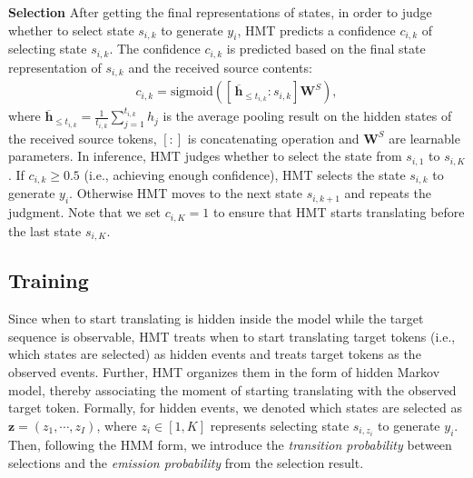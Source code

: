 \documentclass{article} %
\begin{document}
\textbf{Selection} After getting the final representations of states, in order to judge whether to select state $s_{i,k}$ to generate $y_{i}$, HMT predicts a confidence $c_{i,k}$ of selecting state $s_{i,k}$. The confidence $c_{i,k}$ is predicted based on the final state representation of $s_{i,k}$ and the received source contents:
\begin{gather}
    c_{i,k}=\mathrm{sigmoid}\left ( \left [ \,\overline{\mathbf{h}}_{\leq t_{i,k}}\!: s_{i,k} \right ]\!\mathbf{W}^{S} \right ), \label{eq:bik}
\end{gather}
\vspace{-1mm}where $\overline{\mathbf{h}}_{\leq t_{i,k}}\!=\!\frac{1}{t_{i,k}}\sum_{j=1}^{t_{i,k}} h_{j}$ is the average pooling result on the hidden states of the received source tokens, $\left [ :\right ]$ is concatenating operation and $\mathbf{W}^{S}$ are learnable parameters.
In inference, HMT judges whether to select the state from $s_{i,1}$ to $s_{i,K}$. If $c_{i,k}\!\geq\! 0.5$ (i.e., achieving enough confidence), HMT selects the state $s_{i,k}$ to generate $y_{i}$. Otherwise HMT moves to the next state $s_{i,k+1}$ and repeats the judgment. Note that we set $c_{i,K}\!=\!1$ to ensure that HMT starts translating before the last state $s_{i,K}$.


\subsection{Training}
\label{sec:training}

Since when to start translating is hidden inside the model while the target sequence is observable, HMT treats when to start translating target tokens (i.e., which states are selected) as hidden events and treats target tokens as the observed events. Further, HMT organizes them in the form of hidden Markov model, thereby associating the moment of starting translating with the observed target token.
Formally, for hidden events, we denoted which states are selected as $\mathbf{z}\!=\!\left ( z_{1},\cdots ,z_{I} \right )$, where $z_{i}\!\in \! \left[1,K \right]$ represents selecting state $s_{i,z_{i}}$ to generate $y_{i}$. Then, following the HMM form, we introduce the \emph{transition probability} between selections and the \emph{emission probability} from the selection result.
\end{document}
